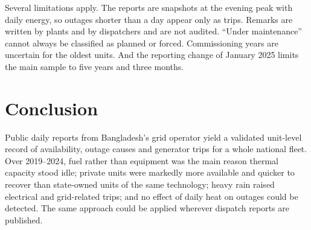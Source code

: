 \documentclass[11pt]{article}
\begin{document}
Several limitations apply. The reports are snapshots at the evening peak with daily energy, so outages shorter than a day appear only as trips. Remarks are written by plants and by dispatchers and are not audited. ``Under maintenance'' cannot always be classified as planned or forced. Commissioning years are uncertain for the oldest units. And the reporting change of January 2025 limits the main sample to five years and three months.

\section{Conclusion}

Public daily reports from Bangladesh's grid operator yield a validated unit-level record of availability, outage causes and generator trips for a whole national fleet. Over 2019--2024, fuel rather than equipment was the main reason thermal capacity stood idle; private units were markedly more available and quicker to recover than state-owned units of the same technology; heavy rain raised electrical and grid-related trips; and no effect of daily heat on outages could be detected. The same approach could be applied wherever dispatch reports are published.



\end{document}
